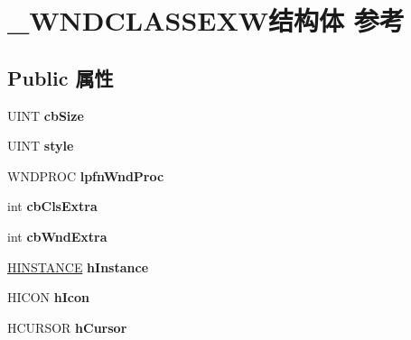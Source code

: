\hypertarget{struct___w_n_d_c_l_a_s_s_e_x_w}{}\section{\+\_\+\+W\+N\+D\+C\+L\+A\+S\+S\+E\+X\+W结构体 参考}
\label{struct___w_n_d_c_l_a_s_s_e_x_w}
\subsection*{Public 属性}
\begin{DoxyCompactItemize}
\item 
\mbox{\label{struct___w_n_d_c_l_a_s_s_e_x_w_a76eb911e4e3626632d681a6f22844843}} 
U\+I\+NT {\bfseries cb\+Size}
\item 
\mbox{\label{struct___w_n_d_c_l_a_s_s_e_x_w_aa97940275292cd4ddfefdf3c8d44fe59}} 
U\+I\+NT {\bfseries style}
\item 
\mbox{\label{struct___w_n_d_c_l_a_s_s_e_x_w_a6fbda05e01abd22f72ac08246fbc6b87}} 
W\+N\+D\+P\+R\+OC {\bfseries lpfn\+Wnd\+Proc}
\item 
\mbox{\label{struct___w_n_d_c_l_a_s_s_e_x_w_ac2c0c0af72d29a7864f9aae2fa1dc73c}} 
int {\bfseries cb\+Cls\+Extra}
\item 
\mbox{\label{struct___w_n_d_c_l_a_s_s_e_x_w_a7f9078cd20f7e1800f3330eb3ba65484}} 
int {\bfseries cb\+Wnd\+Extra}
\item 
\mbox{\label{struct___w_n_d_c_l_a_s_s_e_x_w_a91decba3637b66f51de738f62688d657}} 
\hyperlink{interfacevoid}{H\+I\+N\+S\+T\+A\+N\+CE} {\bfseries h\+Instance}
\item 
\mbox{\label{struct___w_n_d_c_l_a_s_s_e_x_w_ad08eb7601f9be72bae980dfd3e1beab9}} 
H\+I\+C\+ON {\bfseries h\+Icon}
\item 
\mbox{\label{struct___w_n_d_c_l_a_s_s_e_x_w_a8bb6a6ba18b5b37ef8c9faa8d525567c}} 
H\+C\+U\+R\+S\+OR {\bfseries h\+Cursor}

\end{DoxyCompactItemize}

